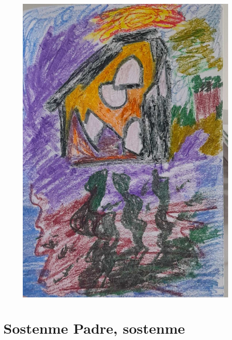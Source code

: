 \documentclass[12pt, a4paper, twoside]{book} %
\begin{document}
\begin{figure}[H]
	\centering
	\includegraphics[width=\textwidth]{./images/1f81324df38bf5.jpg}
\end{figure}
%
\chapter{Sostenme Padre, sostenme}
\end{document}
